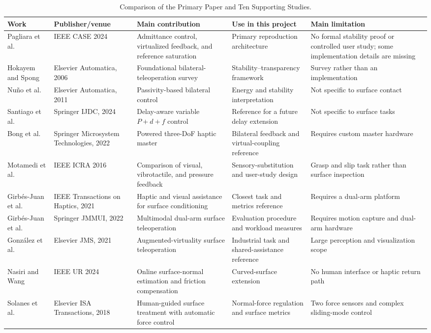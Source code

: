 \documentclass[journal]{IEEEtran}
\begin{document}
\begin{table}[!t]
\caption{Comparison of the Primary Paper and Ten Supporting Studies.}
\label{tab:lit}
\centering\scriptsize
\renewcommand{\arraystretch}{1.15}
\begin{tabularx}{\textwidth}{@{}p{2.3cm}p{2.5cm}p{3.6cm}p{3.6cm}X@{}}
\toprule
Work & Publisher/venue & Main contribution & Use in this project & Main limitation\\
\midrule
Pagliara et al.\ \cite{pagliara} & IEEE CASE 2024 & Admittance control, virtualized feedback, and reference saturation & Primary reproduction architecture & No formal stability proof or controlled user study; some implementation details are missing\\
Hokayem and Spong \cite{hokayem} & Elsevier Automatica, 2006 & Foundational bilateral-teleoperation survey & Stability--transparency framework & Survey rather than an implementation\\
Nu\~no et al.\ \cite{nuno} & Elsevier Automatica, 2011 & Passivity-based bilateral control & Energy and stability interpretation & Not specific to surface contact\\
Santiago et al.\ \cite{santiago} & Springer IJDC, 2024 & Delay-aware variable $P{+}d{+}f$ control & Reference for a future delay extension & Not specific to surface tasks\\
Bong et al.\ \cite{bong} & Springer Microsystem Technologies, 2022 & Powered three-DoF haptic master & Bilateral feedback and virtual-coupling reference & Requires custom master hardware\\
Motamedi et al.\ \cite{motamedi} & IEEE ICRA 2016 & Comparison of visual, vibrotactile, and pressure feedback & Sensory-substitution and user-study design & Grasp and slip task rather than surface inspection\\
Girb\'es-Juan et al.\ \cite{girbes1} & IEEE Transactions on Haptics, 2021 & Haptic and visual assistance for surface conditioning & Closest task and metrics reference & Requires a dual-arm platform\\
Girb\'es-Juan et al.\ \cite{girbes2} & Springer JMMUI, 2022 & Multimodal dual-arm surface teleoperation & Evaluation procedure and workload measures & Requires motion capture and dual-arm hardware\\
Gonz\'alez et al.\ \cite{gonzalez} & Elsevier JMS, 2021 & Augmented-virtuality surface teleoperation & Industrial task and shared-assistance reference & Large perception and visualization scope\\
Nasiri and Wang \cite{nasiri} & IEEE UR 2024 & Online surface-normal estimation and friction compensation & Curved-surface extension & No human interface or haptic return path\\
Solanes et al.\ \cite{solanes} & Elsevier ISA Transactions, 2018 & Human-guided surface treatment with automatic force control & Normal-force regulation and surface metrics & Two force sensors and complex sliding-mode control\\
\bottomrule
\end{tabularx}
\end{table}
\end{document}
